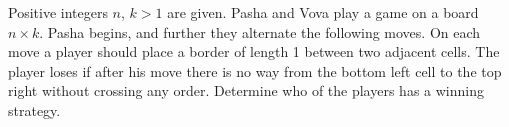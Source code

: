Positive integers $n$, $k>1$ are given. Pasha and Vova play a game on a board $n\times k$.  Pasha begins, and further they alternate the following moves. On each move a player should place a border of length 1 between two adjacent cells. The player loses if after his move there is no way from the bottom left cell to the top right without crossing any order. Determine who of the players has a winning strategy.